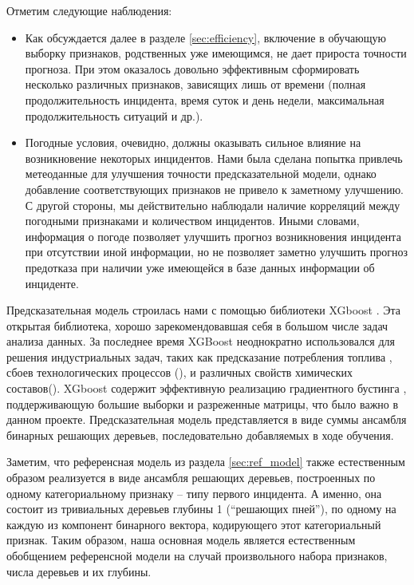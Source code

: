 Отметим следующие наблюдения:
\begin{itemize}
\item Как обсуждается далее в разделе \ref{sec:efficiency}, включение в обучающую выборку признаков, родственных уже имеющимся, не дает прироста точности прогноза.
При этом оказалось довольно эффективным сформировать несколько различных признаков, зависящих лишь от времени (полная продолжительность инцидента, время суток и день недели, максимальная продолжительность ситуаций и др.).
\item Погодные условия, очевидно, должны оказывать сильное влияние на возникновение некоторых инцидентов. Нами была сделана попытка привлечь метеоданные для улучшения точности предсказательной модели, однако добавление соответствующих признаков не привело к заметному улучшению. С другой стороны, мы действительно наблюдали наличие корреляций между погодными признаками и количеством инцидентов. Иными словами, информация о погоде позволяет улучшить прогноз возникновения инцидента при отсутствии иной информации, но не позволяет заметно улучшить прогноз предотказа при наличии уже имеющейся в базе данных информации об инциденте.
\end{itemize}
Предсказательная модель строилась нами с помощью библиотеки XGboost \cite{chen2016xgboost}. Эта открытая библиотека, хорошо зарекомендовавшая себя в большом числе задач анализа данных\cite{chen2016xgboost}. За последнее время XGBoost неоднократно использовался для решения индустриальных задач, таких как предсказание потребления топлива \cite{horituchi2017predicting}, сбоев технологических процессов (\cite{bosch,DBLP:conf/bigdataconf/Hebert16}), и различных свойств химических составов(\cite{sheridan2016extreme,babajide2016bioactive}). XGboost содержит эффективную реализацию градиентного бустинга \cite{friedman2001greedy}, поддерживающую большие выборки и разреженные матрицы, что было важно в данном проекте. Предсказательная модель представляется в виде суммы ансамбля  бинарных решающих деревьев, последовательно добавляемых в ходе обучения.

Заметим, что референсная модель из раздела  \ref{sec:ref_model} также естественным образом реализуется в виде ансамбля решающих деревьев, построенных по одному категориальному признаку -- типу первого инцидента. А именно, она состоит из тривиальных деревьев глубины 1 (``решающих пней''), по одному на каждую из компонент бинарного вектора, кодирующего этот категориальный признак. Таким образом, наша основная модель является естественным обобщением референсной модели на случай произвольного набора признаков, числа деревьев и их глубины.

